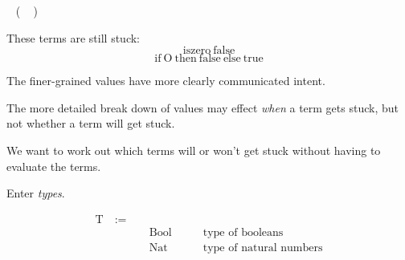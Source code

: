 \begin{frame}
  \begin{mdframed}[frametitle={Small-step semantics}]
  \infrule[E-IsZeroSucc]
        {}
        {~ \left( ~ \right) \longrightarrow {}}
  \end{mdframed}
\end{frame}

\begin{frame}
  These terms are still stuck:
\begin{displaymath}
\text{iszero}~\text{false}
\end{displaymath}
\begin{displaymath}
\text{if}~\text{O}~\text{then}~\text{false}~\text{else}~\text{true}
\end{displaymath}
\end{frame}

\begin{frame}[c]
  The finer-grained values have more clearly communicated intent.
\end{frame}

\begin{frame}[c]
  The more detailed break down of values may effect {\it when} a term gets stuck, but not whether a term will get stuck.
\end{frame}

\begin{frame}[c]
  We want to work out which terms will or won't get stuck without having to evaluate the terms.
\end{frame}

\begin{frame}[c]
  Enter {\it types}.
\end{frame}

\begin{frame}
  \begin{mdframed}[frametitle={Types}]
\begin{displaymath}
    \begin{aligned}
\text{T} \quad:=\quad& ~ &\\
  & ~ \text{Bool} \quad\quad &\text{type of booleans} \\
  & ~ \text{Nat} \quad\quad &\text{type of natural numbers} \\
    \end{aligned}
  \end{displaymath}
  \end{mdframed}
\end{frame}

